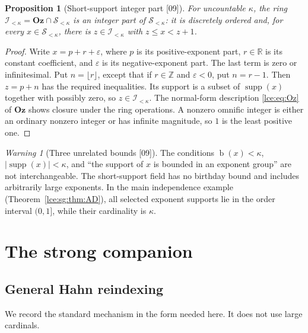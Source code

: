 \documentclass[11pt,letterpaper]{article}
\numberwithin{equation}{section}
\newtheorem{proposition}[theorem]{Proposition}
\theoremstyle{definition}
\theoremstyle{remark}
\newcommand{\Oz}{\mathbf{Oz}}
\newcommand{\R}{\mathbb R}
\newcommand{\Z}{\mathbb Z}
\newcommand{\supp}{\operatorname{supp}}
\newcommand{\bd}{\operatorname{b}}
\newcommand{\Sk}{\mathscr S_{<\kappa}}
\newcommand{\Ik}{\mathscr I_{<\kappa}}
\newcommand{\eps}{\varepsilon}
\newcommand{\abs}[1]{\lvert#1\rvert}
\newcommand{\thref}[1]{Theorem~\ref{#1}}
\newtheorem{warning}[theorem]{Warning}
\newcommand{\src}[1]{\textup{\textsf{\small[#1]}}}%
\begin{document}
\begin{proposition}[Short-support integer part \src{09}]\label{lce:sg:prop:integerpart}
For uncountable $\kappa$, the ring $\Ik=\Oz\cap\Sk$ is an integer part of
$\Sk$: it is discretely ordered and, for every $x\in\Sk$, there is $z\in\Ik$
with $z\le x<z+1$.
\end{proposition}
\begin{proof}
Write $x=p+r+\eps$, where $p$ is its positive-exponent part, $r\in\R$ is its
constant coefficient, and $\eps$ is its negative-exponent part. The last term
is zero or infinitesimal. Put $n=\lfloor r\rfloor$, except that if $r\in\Z$
and $\eps<0$, put $n=r-1$. Then $z=p+n$ has the required inequalities. Its
support is a subset of $\supp(x)$ together with possibly zero, so $z\in\Ik$.
The normal-form description \eqref{lce:eq:Oz} of $\Oz$ shows closure under
the ring operations. A nonzero omnific integer is either an ordinary nonzero
integer or has infinite magnitude, so $1$ is the least positive one.
\end{proof}

\begin{warning}[Three unrelated bounds \src{09}]\label{lce:sg:warn:bounds}
The conditions $\bd(x)<\kappa$, $\abs{\supp(x)}<\kappa$, and ``the support of
$x$ is bounded in an exponent group'' are not interchangeable. The
short-support field has no birthday bound and includes arbitrarily large
exponents. In the main independence example
(\thref{lce:sg:thm:AD}), all selected exponent supports lie in the order
interval $(0,1]$, while their cardinality is $\kappa$.
\end{warning}

\section{The strong companion}\label{lce:sec:companion}

\subsection{General Hahn reindexing}
We record the standard mechanism in the form needed here. It does not use
large cardinals.
\end{document}
